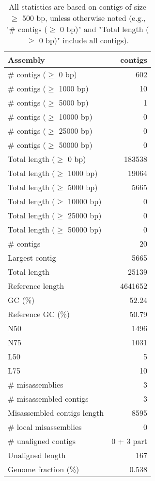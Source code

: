 \documentclass[12pt,a4paper]{article}
\begin{document}
\begin{table}[ht]
\begin{center}
\caption{All statistics are based on contigs of size $\geq$ 500 bp, unless otherwise noted (e.g., "\# contigs ($\geq$ 0 bp)" and "Total length ($\geq$ 0 bp)" include all contigs).}
\begin{tabular}{|l*{1}{|r}|}
\hline
Assembly & contigs \\ \hline
\# contigs ($\geq$ 0 bp) & 602 \\ \hline
\# contigs ($\geq$ 1000 bp) & 10 \\ \hline
\# contigs ($\geq$ 5000 bp) & 1 \\ \hline
\# contigs ($\geq$ 10000 bp) & 0 \\ \hline
\# contigs ($\geq$ 25000 bp) & 0 \\ \hline
\# contigs ($\geq$ 50000 bp) & 0 \\ \hline
Total length ($\geq$ 0 bp) & 183538 \\ \hline
Total length ($\geq$ 1000 bp) & 19064 \\ \hline
Total length ($\geq$ 5000 bp) & 5665 \\ \hline
Total length ($\geq$ 10000 bp) & 0 \\ \hline
Total length ($\geq$ 25000 bp) & 0 \\ \hline
Total length ($\geq$ 50000 bp) & 0 \\ \hline
\# contigs & 20 \\ \hline
Largest contig & 5665 \\ \hline
Total length & 25139 \\ \hline
Reference length & 4641652 \\ \hline
GC (\%) & 52.24 \\ \hline
Reference GC (\%) & 50.79 \\ \hline
N50 & 1496 \\ \hline
N75 & 1031 \\ \hline
L50 & 5 \\ \hline
L75 & 10 \\ \hline
\# misassemblies & 3 \\ \hline
\# misassembled contigs & 3 \\ \hline
Misassembled contigs length & 8595 \\ \hline
\# local misassemblies & 0 \\ \hline
\# unaligned contigs & 0 + 3 part \\ \hline
Unaligned length & 167 \\ \hline
Genome fraction (\%) & 0.538 \\ \hline

\end{tabular}
\end{center}
\end{table}
\end{document}
